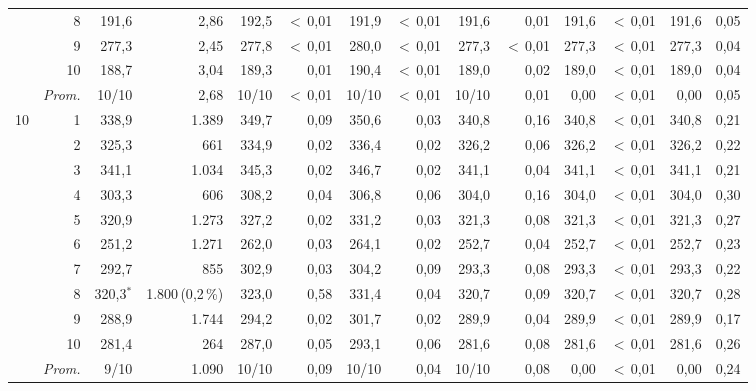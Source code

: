 \documentclass[11pt,a4paper]{article}
\begin{document}
\begin{table}[htbp]
{\begin{tabular}{rr rr rr rr rr rr rr}
 & 8 & 191{,}6 & 2{,}86 & 192{,}5 & $<$\,0{,}01 & 191{,}9 & $<$\,0{,}01 & 191{,}6 & 0{,}01 & 191{,}6 & $<$\,0{,}01 & 191{,}6 & 0{,}05 \\
 & 9 & 277{,}3 & 2{,}45 & 277{,}8 & $<$\,0{,}01 & 280{,}0 & $<$\,0{,}01 & 277{,}3 & $<$\,0{,}01 & 277{,}3 & $<$\,0{,}01 & 277{,}3 & 0{,}04 \\
 & 10 & 188{,}7 & 3{,}04 & 189{,}3 & 0{,}01 & 190{,}4 & $<$\,0{,}01 & 189{,}0 & 0{,}02 & 189{,}0 & $<$\,0{,}01 & 189{,}0 & 0{,}04 \\
\cmidrule(l){2-14}
 & \emph{Prom.} & 10/10 & 2{,}68 & 10/10 & $<$\,0{,}01 & 10/10 & $<$\,0{,}01 & 10/10 & 0{,}01 & 0{,}00 & $<$\,0{,}01 & 0{,}00 & 0{,}05 \\
\midrule
10 & 1 & 338{,}9 & 1.389 & 349{,}7 & 0{,}09 & 350{,}6 & 0{,}03 & 340{,}8 & 0{,}16 & 340{,}8 & $<$\,0{,}01 & 340{,}8 & 0{,}21 \\
 & 2 & 325{,}3 & 661 & 334{,}9 & 0{,}02 & 336{,}4 & 0{,}02 & 326{,}2 & 0{,}06 & 326{,}2 & $<$\,0{,}01 & 326{,}2 & 0{,}22 \\
 & 3 & 341{,}1 & 1.034 & 345{,}3 & 0{,}02 & 346{,}7 & 0{,}02 & 341{,}1 & 0{,}04 & 341{,}1 & $<$\,0{,}01 & 341{,}1 & 0{,}21 \\
 & 4 & 303{,}3 & 606 & 308{,}2 & 0{,}04 & 306{,}8 & 0{,}06 & 304{,}0 & 0{,}16 & 304{,}0 & $<$\,0{,}01 & 304{,}0 & 0{,}30 \\
 & 5 & 320{,}9 & 1.273 & 327{,}2 & 0{,}02 & 331{,}2 & 0{,}03 & 321{,}3 & 0{,}08 & 321{,}3 & $<$\,0{,}01 & 321{,}3 & 0{,}27 \\
 & 6 & 251{,}2 & 1.271 & 262{,}0 & 0{,}03 & 264{,}1 & 0{,}02 & 252{,}7 & 0{,}04 & 252{,}7 & $<$\,0{,}01 & 252{,}7 & 0{,}23 \\
 & 7 & 292{,}7 & 855 & 302{,}9 & 0{,}03 & 304{,}2 & 0{,}09 & 293{,}3 & 0{,}08 & 293{,}3 & $<$\,0{,}01 & 293{,}3 & 0{,}22 \\
 & 8 & 320{,}3$^{*}$ & 1.800\,{\scriptsize(0{,}2\,\%)} & 323{,}0 & 0{,}58 & 331{,}4 & 0{,}04 & 320{,}7 & 0{,}09 & 320{,}7 & $<$\,0{,}01 & 320{,}7 & 0{,}28 \\
 & 9 & 288{,}9 & 1.744 & 294{,}2 & 0{,}02 & 301{,}7 & 0{,}02 & 289{,}9 & 0{,}04 & 289{,}9 & $<$\,0{,}01 & 289{,}9 & 0{,}17 \\
 & 10 & 281{,}4 & 264 & 287{,}0 & 0{,}05 & 293{,}1 & 0{,}06 & 281{,}6 & 0{,}08 & 281{,}6 & $<$\,0{,}01 & 281{,}6 & 0{,}26 \\
\cmidrule(l){2-14}
 & \emph{Prom.} & 9/10 & 1.090 & 10/10 & 0{,}09 & 10/10 & 0{,}04 & 10/10 & 0{,}08 & 0{,}00 & $<$\,0{,}01 & 0{,}00 & 0{,}24 \\
\bottomrule
\end{tabular}%
}
\end{table}
\end{document}
